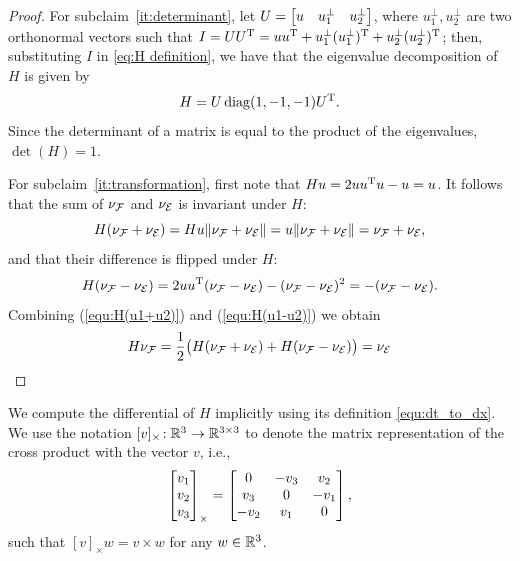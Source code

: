 \documentclass[10pt,twocolumn,twoside]{IEEEtran}
\begin{document}
{\begin{proof}
  For subclaim~\ref{it:determinant}, let $U=\begin{bmatrix}u & u^\bot_{1} & u^\bot_{2}\end{bmatrix}$, where $u^\bot_{1},u^\bot_{2}$ are two orthonormal vectors such that $I=UU^\mathrm{T}=uu^\mathrm{T} + u^\bot_{1}(u^\bot_{1})^\mathrm{T}+u^\bot_{2}(u^\bot_{2})^\mathrm{T}$; then, substituting $I$ in \eqref{eq:H definition}, we have that the eigenvalue decomposition of $H$ is given by
  \begin{equation}
    H=U\operatorname{diag}(1,-1,-1) U^\mathrm{T}.
  \end{equation}
  Since the determinant of a matrix is equal to the product of the eigenvalues, $\det(H)=1$.

  For subclaim~\ref{it:transformation}, first note that $Hu=2uu^\mathrm{T} u - u=u$.
  It follows that the sum of $\nu_{\mathcal{F}}$ and $\nu_{\mathcal{E}}$ is invariant under $H$:
  \begin{equation}\label{equ:H(u1+u2)}
    H(\nu_{\mathcal{F}}+\nu_{\mathcal{E}})=H u \lVert\nu_{\mathcal{F}}+\nu_{\mathcal{E}}\rVert
    = u\lVert\nu_{\mathcal{F}}+\nu_{\mathcal{E}}\rVert =\nu_{\mathcal{F}}+\nu_{\mathcal{E}},
  \end{equation}
  and that their difference is flipped under $H$:
  \begin{equation}\label{equ:H(u1-u2)}
    H(\nu_{\mathcal{F}}-\nu_{\mathcal{E}}) = 2uu^\mathrm{T} (\nu_{\mathcal{F}}-\nu_{\mathcal{E}}) - (\nu_{\mathcal{F}}-\nu_{\mathcal{E}})^2 = -(\nu_{\mathcal{F}}-\nu_{\mathcal{E}}).
  \end{equation}
  Combining (\ref{equ:H(u1+u2)}) and (\ref{equ:H(u1-u2)}) we obtain
  \begin{equation}
    H\nu_{\mathcal{F}} = \frac{1}{2}\bigl(H(\nu_{\mathcal{F}}+\nu_{\mathcal{E}})+H(\nu_{\mathcal{F}}-\nu_{\mathcal{E}})\bigr)
    = \nu_{\mathcal{E}}
  \end{equation}
\end{proof}
We compute the differential of $H$ implicitly using its definition \eqref{equ:dt_to_dx}. We use the notation $[v]_{\times}\!:\mathbb{R}^{3}{}\to\mathbb{R}^{3\times 3}{}$ to denote the matrix representation of the cross product with the vector $v$, i.e.,
\begin{equation}
  \begin{bmatrix}v_1\\v_2\\v_3\end{bmatrix}_\times= \begin{bmatrix}0 & -v_3 &v_2\\v_3 & 0 & -v_1\\-v_2 & v_1 & 0\end{bmatrix},
\end{equation}
such that $[v]_\times w=v\times w$ for any $w\in\mathbb{R}^{3}{}$. %
\begin{proposition}\label{prop:Hderivitive}

\end{proposition}}
\end{document}
